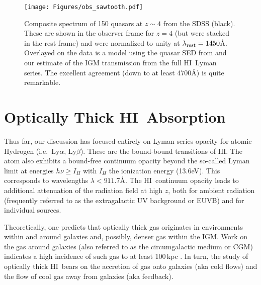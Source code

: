 \documentclass[graybox]{svmult}
\newcommand{\HI}{H{\sc I}}
\def\lya{Ly$\alpha$}
\def\lyb{Ly$\beta$}
\begin{document}
%
\begin{figure}[ht]
\sidecaption
\texttt{[image: Figures/obs\_sawtooth.pdf]}
%
%
\caption{Composite spectrum of 150 quasars at $z \sim 4$
from the SDSS (black).  These are shown in the observer
frame for $z=4$ (but were stacked in the rest-frame)
and were normalized to unity at $\lambda_{\rm rest} = 1450$\AA.
Overlayed on the data is a model using the quasar SED
from \cite{telfer02} and our estimate of the IGM transmission
from the full \HI\ Lyman series.  The excellent agreement
(down to at least 4700\AA) is quite remarkable.
}
\label{fig:stack_saw}       %
\end{figure}

\section{Optically Thick \HI\ Absorption}

Thus far, our discussion has focused entirely on Lyman
series opacity for atomic Hydrogen (i.e.\ \lya, \lyb).
These are the bound-bound transitions of \HI.
The atom also exhibits a bound-free
continuum opacity beyond the so-called Lyman limit
at energies $h \nu \ge I_H$ with
$I_H$ the ionization energy (13.6eV).  This corresponds
to wavelengths $\lambda < 911.7$\AA.
The \HI\ continuum opacity leads to additional attenuation
of the radiation field at high $z$, both for 
ambient radiation (frequently referred to as the
extragalactic UV background or EUVB) and 
for individual sources.

Theoretically, one predicts that optically thick gas originates 
in environments within and around galaxies and, possibly,
denser gas within the IGM.  Work on the gas
around galaxies (also referred to as the circumgalactic medium
or CGM) indicates a high incidence of such gas to at least 100\,kpc
\cite{bb91,QPQ5,p+17}.
In turn, the study of optically thick \HI\ bears
on the accretion of gas onto galaxies (aka cold flows) and
the flow of cool gas away from galaxies (aka feedback).
\end{document}

